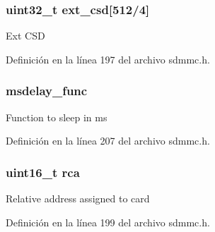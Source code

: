 \subsubsection[{\texorpdfstring{ext\+\_\+csd}{ext_csd}}]{\setlength{\rightskip}{0pt plus 5cm}uint32\+\_\+t ext\+\_\+csd\mbox{[}512/4\mbox{]}}\hypertarget{struct_s_d_m_m_c___c_a_r_d___t_ab0fd82a526e95803db0f7c06ed428f8f}{}\label{struct_s_d_m_m_c___c_a_r_d___t_ab0fd82a526e95803db0f7c06ed428f8f}
Ext C\+SD 

Definición en la línea 197 del archivo sdmmc.\+h.

\subsubsection[{\texorpdfstring{msdelay\+\_\+func}{msdelay_func}}]{ msdelay\+\_\+func}\hypertarget{struct_s_d_m_m_c___c_a_r_d___t_aef75c297850362bd49b19f70475f7bad}{}\label{struct_s_d_m_m_c___c_a_r_d___t_aef75c297850362bd49b19f70475f7bad}
Function to sleep in ms 

Definición en la línea 207 del archivo sdmmc.\+h.

\subsubsection[{\texorpdfstring{rca}{rca}}]{\setlength{\rightskip}{0pt plus 5cm}uint16\+\_\+t rca}\hypertarget{struct_s_d_m_m_c___c_a_r_d___t_a507feb31eecad24ea6e75566817e4961}{}\label{struct_s_d_m_m_c___c_a_r_d___t_a507feb31eecad24ea6e75566817e4961}
Relative address assigned to card 

Definición en la línea 199 del archivo sdmmc.\+h.

